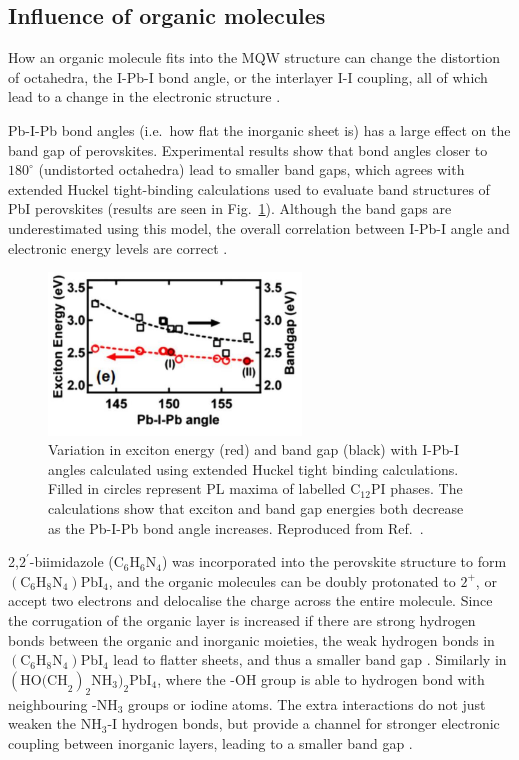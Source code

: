 \subsection{Influence of organic molecules}
How an organic molecule fits into the MQW structure can change the distortion of octahedra, the I-Pb-I bond angle, or the interlayer I-I coupling, all of which lead to a change in the electronic structure \cite{Sourisseau2007}.

Pb-I-Pb bond angles (i.e.\ how flat the inorganic sheet is) has a large effect on the band gap of perovskites. Experimental results show that bond angles closer to $180^{\circ}$ (undistorted octahedra) lead to smaller band gaps, which agrees with extended Huckel tight-binding calculations used to evaluate band structures of PbI perovskites (results are seen in Fig.\ \ref{2Fig19}). Although the band gaps are underestimated using this model, the overall correlation between I-Pb-I angle and electronic energy levels are correct \cite{Pradeesh2009}.
\begin{figure}[ht]
\centering
\includegraphics[width=0.6\textwidth]{Fig19}
\caption{Variation in exciton energy (red) and band gap (black) with I-Pb-I angles calculated using extended Huckel tight binding calculations.  Filled in circles represent PL maxima of labelled $\textrm{C}_{12}$PI phases. The calculations show that exciton and band gap energies both decrease as the Pb-I-Pb bond angle increases. Reproduced from Ref.\ \cite{Pradeesh2009}.}
\label{2Fig19}
\end{figure}

2,$2^{'}$-biimidazole ($\textrm{C}_6\textrm{H}_6\textrm{N}_4$) was incorporated into the perovskite structure to form $(\textrm{C}_6\textrm{H}_8\textrm{N}_4)\textrm{PbI}_4$, and the organic molecules can be doubly protonated to $2^+$, or accept two electrons and delocalise the charge across the entire molecule. Since the corrugation of the organic layer is increased if there are strong hydrogen bonds between the organic and inorganic moieties, the weak hydrogen bonds in $(\textrm{C}_6\textrm{H}_8\textrm{N}_4)\textrm{PbI}_4$ lead to flatter sheets, and thus a smaller band gap \cite{Tang2001}. Similarly in $(\textrm{HO(CH}_2)_2\textrm{NH}_3)_2\textrm{PbI}_4$, where the -OH group is able to hydrogen bond with neighbouring -$\textrm{NH}_3$ groups or iodine atoms. The extra interactions do not just weaken the $\textrm{NH}_3$-I hydrogen bonds, but provide a channel for stronger electronic coupling between inorganic layers, leading to a smaller band gap \cite{Mercier2004}.


